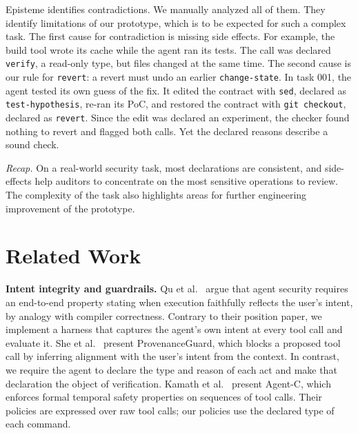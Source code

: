 \documentclass{article}
\newcommand{\toolname}{{\sc Episteme}\xspace}
\theoremstyle{plain}
\theoremstyle{definition}
\theoremstyle{remark}
\begin{document}
\toolname identifies \EfourNcontradictedCalls{} contradictions.
We manually analyzed all of them. They identify limitations of our prototype, which is to be expected for such a complex task.
The first cause for contradiction is missing side effects. 
For example, the build tool wrote its cache while the agent ran its tests. 
The call was declared \texttt{verify}, a read-only type, but files changed at the same time.
The second cause is our rule for \texttt{revert}: a revert must undo an earlier \texttt{change-state}. In task 001, the agent tested its own guess of the fix. It edited the contract with \texttt{sed}, declared as \texttt{test-hypothesis}, re-ran its PoC, and restored the contract with \texttt{git checkout}, declared as \texttt{revert}. 
Since the edit was declared an experiment, the checker found nothing to revert and flagged both calls. 
Yet the declared reasons describe a sound check.

\emph{Recap.} On a real-world security task, most declarations are consistent, and side-effects help auditors to concentrate on the most sensitive operations to review. The complexity of the task also highlights areas for further engineering improvement of the prototype.

\section{Related Work}

\noindent\textbf{Intent integrity and guardrails.}
Qu et al.~\cite{Qu2026SecuringLA} argue that agent security requires an end-to-end property stating when execution faithfully reflects the user's intent, by analogy with compiler correctness. Contrary to their position paper, we implement a harness that captures the agent's own intent at every tool call and evaluate it.
She et al.~\cite{She2026SafeguardingLA} present ProvenanceGuard, which blocks a proposed tool call by inferring alignment with the user's intent from the context. In contrast, we require the agent to declare the type and reason of each act and make that declaration the object of verification.
Kamath et al.~\cite{Kamath2025EnforcingTC} present Agent-C, which enforces formal temporal safety properties on sequences of tool calls. Their policies are expressed over raw tool calls; our policies use the declared type of each command.
\end{document}
